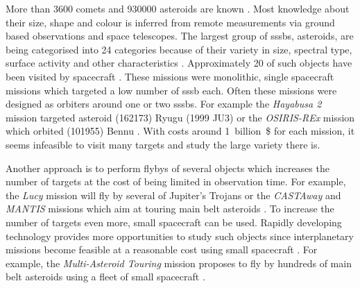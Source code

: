 More than \SI{3600}{} comets and \SI{930000}{} asteroids are known \cite{nasaSBD_count, mpc2020}. Most knowledge about their size, shape and colour is inferred from remote measurements via ground based observations and space telescopes. The largest group of \glspl{sssb}, asteroids, are being categorised into \SI{24}{} categories because of their variety in size, spectral type, surface activity and other characteristics \cite{demeo2009extension}. Approximately \SI{20}{} of such objects have been visited by spacecraft \cite{nasaSBD_missions}. These missions were monolithic, single spacecraft missions which targeted a low number of \gls{sssb} each. Often these missions were designed as orbiters around one or two \glspl{sssb}. For example the \textit{Hayabusa 2} mission targeted asteroid (162173) Ryugu (1999 JU3) or the \textit{OSIRIS-REx} mission which orbited (101955) Bennu \cite{watanabe2017hayabusa2, lauretta2017osiris}. With costs around 1~billion~\$ for each mission, it seems infeasible to visit many targets and study the large variety there is.

Another approach is to perform flybys of several objects which increases the number of targets at the cost of being limited in observation time. For example, the \textit{Lucy} mission will fly by several of Jupiter's Trojans \cite{stanbridge2017lucy} or the \textit{CASTAway} and \textit{MANTIS} missions which aim at touring main belt asteroids \cite{bowles2018castaway, rivkin2016mainmantis}. To increase the number of targets even more, small spacecraft can be used. Rapidly developing technology provides more opportunities to study such objects since interplanetary missions become feasible at a reasonable cost using small spacecraft \cite{poghosyan2017cubesat, andrews2019asteroid, snodgrass2019europeanCI}. For example, the \textit{Multi-Asteroid Touring} mission proposes to fly by hundreds of main belt asteroids using a fleet of small spacecraft \cite{Slavinskis2018NanospacecraftSails}.

